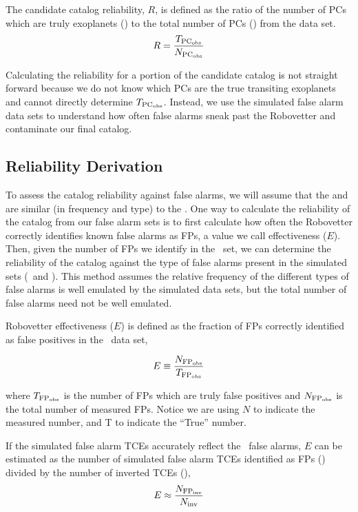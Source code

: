 The candidate catalog reliability, $R$, is defined as the ratio of the number of PCs which are truly exoplanets (\trueopspc) to the total number of PCs (\opspc) from the \opstce{} data set. 
\begin{equation}
\label{eq:rel}
R = \frac{T_{\rm PC_{\rm obs}}}{N_{\rm PC_{\rm obs}}}
\end{equation}

Calculating the reliability for a portion of the candidate catalog is not straight forward because we do not know which PCs are the true transiting exoplanets and cannot directly determine $T_{\rm PC_{\rm obs}}$. Instead, we use the simulated false alarm data sets to understand how often false alarms sneak past the Robovetter and contaminate our final catalog.


\subsection{Reliability Derivation}
\label{s:relcalc}
To assess the catalog reliability against false alarms, we will assume that the  and  are similar (in frequency and type) to the \opstces.  One way to calculate the reliability of the catalog from our false alarm sets is to first calculate how often the Robovetter correctly identifies known false alarms as FPs, a value we call effectiveness ($E$).  Then, given the number of FPs we identify in the \opstce\ set, we can determine the reliability of the catalog against the type of false alarms present in the simulated sets (\invtces\ and \scrtces). This method assumes the relative frequency of the different types of false alarms is well emulated by the simulated data sets, but the total number of false alarms need not be well emulated.


Robovetter effectiveness ($E$) is defined as the fraction of FPs correctly identified as false positives in the \opstce\ data set,

\begin{equation}
\label{effect1}
E \equiv \frac{N_{\rm FP_{\rm obs}}}{T_{\rm FP_{\rm obs}}}
\end{equation}

\noindent where $T_{\rm FP_{\rm obs}}$ is the number of FPs which are truly false positives and $N_{\rm FP_{\rm obs}}$ is the total number of measured FPs. Notice we are using $N$ to indicate the measured number, and T to indicate the ``True'' number. 

If the simulated false alarm TCEs accurately reflect the \opstce\ false alarms, $E$ can be estimated as the number of simulated false alarm TCEs identified as FPs (\invfp) divided by the number of inverted TCEs (\invN), 
\begin{equation}
\label{effect2}
E \approx \frac{N_{\rm FP_{\rm inv}}}{N_{\rm inv}}
\end{equation}

